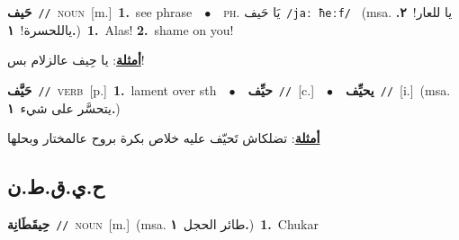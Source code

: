 \documentclass[10pt,a4paper,twoside]{article} %
\begin{document}
\begin{multicols}{2}
{\setlength\topsep{0pt}\textbf{\foreignlanguage{arabic}{حَيف}}\ {\color{gray}\texttt{//}\color{black}}\ \textsc{noun}\ [m.]\ \textbf{1.}~see phrase\ \ $\bullet$\ \ \textsc{ph.} \color{gray} \foreignlanguage{arabic}{يَا حَيف}\color{black}\ {\color{gray}\texttt{/{\sffamily jaː ħeːf}/}\color{black}}\ \color{gray} (msa. \foreignlanguage{arabic}{يا للعار!}~\foreignlanguage{arabic}{\textbf{٢.}}  \foreignlanguage{arabic}{ياللحسرة!}~\foreignlanguage{arabic}{\textbf{١.}})\color{black}\ \textbf{1.}~Alas!  \textbf{2.}~shame on you!\  \begin{flushright}\color{gray}\foreignlanguage{arabic}{\textbf{\underline{\foreignlanguage{arabic}{أمثلة}}}: يا حِيف عالزلام بس!}\end{flushright}\color{black}} \vspace{2mm}

{\setlength\topsep{0pt}\textbf{\foreignlanguage{arabic}{حَيَّف}}\ {\color{gray}\texttt{//}\color{black}}\ \textsc{verb}\ [p.]\ \textbf{1.}~lament over sth\ \ $\bullet$\ \ \setlength\topsep{0pt}\textbf{\foreignlanguage{arabic}{حيِّف}}\ {\color{gray}\texttt{//}\color{black}}\ [c.]\ \ $\bullet$\ \ \setlength\topsep{0pt}\textbf{\foreignlanguage{arabic}{يحيِّف}}\ {\color{gray}\texttt{//}\color{black}}\ [i.]\ \color{gray}(msa. \foreignlanguage{arabic}{يتحسَّر على شيء}~\foreignlanguage{arabic}{\textbf{١.}})\color{black}\  \begin{flushright}\color{gray}\foreignlanguage{arabic}{\textbf{\underline{\foreignlanguage{arabic}{أمثلة}}}: تضلكاش تَحيّف عليه خلاص بكرة بروح عالمختار وبحلها}\end{flushright}\color{black}} \vspace{2mm}

\vspace{-3mm}
\subsection*{\color{blue}\foreignlanguage{arabic}{ح.ي.ق.ط.ن}\color{blue}{ (ntws)}} 

{\setlength\topsep{0pt}\textbf{\foreignlanguage{arabic}{حِيقَطَانِة}}\ {\color{gray}\texttt{//}\color{black}}\ \textsc{noun}\ [m.]\ \color{gray}(msa. \foreignlanguage{arabic}{طائر الحجل}~\foreignlanguage{arabic}{\textbf{١.}})\color{black}\ \textbf{1.}~Chukar\ } \vspace{2mm}


\end{multicols}
\end{document}

